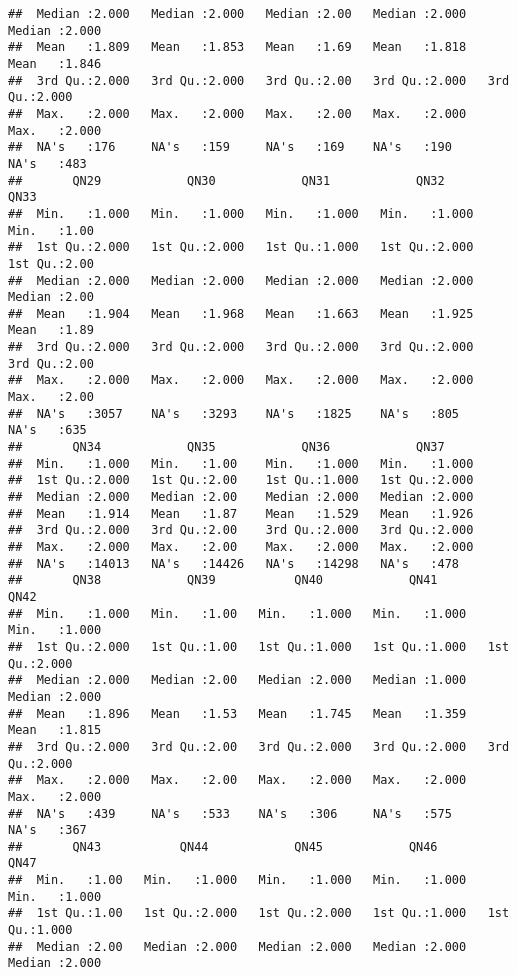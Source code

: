 \documentclass[
]{article}
\begin{document}
\begin{verbatim}
##  Median :2.000   Median :2.000   Median :2.00   Median :2.000   Median :2.000  
##  Mean   :1.809   Mean   :1.853   Mean   :1.69   Mean   :1.818   Mean   :1.846  
##  3rd Qu.:2.000   3rd Qu.:2.000   3rd Qu.:2.00   3rd Qu.:2.000   3rd Qu.:2.000  
##  Max.   :2.000   Max.   :2.000   Max.   :2.00   Max.   :2.000   Max.   :2.000  
##  NA's   :176     NA's   :159     NA's   :169    NA's   :190     NA's   :483    
##       QN29            QN30            QN31            QN32            QN33     
##  Min.   :1.000   Min.   :1.000   Min.   :1.000   Min.   :1.000   Min.   :1.00  
##  1st Qu.:2.000   1st Qu.:2.000   1st Qu.:1.000   1st Qu.:2.000   1st Qu.:2.00  
##  Median :2.000   Median :2.000   Median :2.000   Median :2.000   Median :2.00  
##  Mean   :1.904   Mean   :1.968   Mean   :1.663   Mean   :1.925   Mean   :1.89  
##  3rd Qu.:2.000   3rd Qu.:2.000   3rd Qu.:2.000   3rd Qu.:2.000   3rd Qu.:2.00  
##  Max.   :2.000   Max.   :2.000   Max.   :2.000   Max.   :2.000   Max.   :2.00  
##  NA's   :3057    NA's   :3293    NA's   :1825    NA's   :805     NA's   :635   
##       QN34            QN35            QN36            QN37      
##  Min.   :1.000   Min.   :1.00    Min.   :1.000   Min.   :1.000  
##  1st Qu.:2.000   1st Qu.:2.00    1st Qu.:1.000   1st Qu.:2.000  
##  Median :2.000   Median :2.00    Median :2.000   Median :2.000  
##  Mean   :1.914   Mean   :1.87    Mean   :1.529   Mean   :1.926  
##  3rd Qu.:2.000   3rd Qu.:2.00    3rd Qu.:2.000   3rd Qu.:2.000  
##  Max.   :2.000   Max.   :2.00    Max.   :2.000   Max.   :2.000  
##  NA's   :14013   NA's   :14426   NA's   :14298   NA's   :478    
##       QN38            QN39           QN40            QN41            QN42      
##  Min.   :1.000   Min.   :1.00   Min.   :1.000   Min.   :1.000   Min.   :1.000  
##  1st Qu.:2.000   1st Qu.:1.00   1st Qu.:1.000   1st Qu.:1.000   1st Qu.:2.000  
##  Median :2.000   Median :2.00   Median :2.000   Median :1.000   Median :2.000  
##  Mean   :1.896   Mean   :1.53   Mean   :1.745   Mean   :1.359   Mean   :1.815  
##  3rd Qu.:2.000   3rd Qu.:2.00   3rd Qu.:2.000   3rd Qu.:2.000   3rd Qu.:2.000  
##  Max.   :2.000   Max.   :2.00   Max.   :2.000   Max.   :2.000   Max.   :2.000  
##  NA's   :439     NA's   :533    NA's   :306     NA's   :575     NA's   :367    
##       QN43           QN44            QN45            QN46            QN47      
##  Min.   :1.00   Min.   :1.000   Min.   :1.000   Min.   :1.000   Min.   :1.000  
##  1st Qu.:1.00   1st Qu.:2.000   1st Qu.:2.000   1st Qu.:1.000   1st Qu.:1.000  
##  Median :2.00   Median :2.000   Median :2.000   Median :2.000   Median :2.000  

\end{verbatim}
\end{document}
